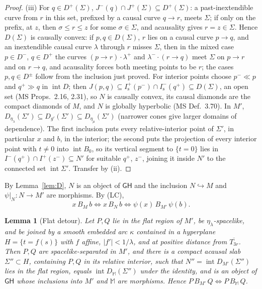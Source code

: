 \documentclass[11pt]{article}
\newtheorem{lemma}[theorem]{Lemma}
\theoremstyle{definition}
\newcommand{\GH}{\mathsf{GH}}
\newcommand{\Mink}{\mathbb M}
\newcommand{\Ifut}{I^{+}}
\newcommand{\Ichr}{I^{-}}
\newcommand{\Jp}{J^{+}}
\newcommand{\Jm}{J^{-}}
\begin{document}
\begin{proof}
(iii) For $q\in D^+(\Sigma)$, $\Jm(q)\cap\Jp(\Sigma)\subseteq D^+(\Sigma)$: a
past-inextendible curve from $r$ in this set, prefixed by a causal curve
$q\to r$, meets $\Sigma$; if only on the prefix, at $z$, then $\sigma\le r\le z$
for some $\sigma\in\Sigma$, and acausality gives $r=z\in\Sigma$. Hence $D(\Sigma)$
is causally convex: if $p,q\in D(\Sigma)$, $r$ lies on a causal curve $p\to q$,
and an inextendible causal curve $\lambda$ through $r$ misses $\Sigma$, then in
the mixed case $p\in D^-$, $q\in D^+$ the curves $(p\to r)\cdot\lambda^+$ and
$\lambda^-\cdot(r\to q)$ meet $\Sigma$ on $p\to r$ and on $r\to q$, and
acausality forces both meeting points to be $r$; the cases $p,q\in D^\pm$
follow from the inclusion just proved. For interior points choose $p^-\ll p$
and $q^+\gg q$ in $\operatorname{int}D$; then
$J(p,q)\subseteq\Ifut_{\mathrm s}(p^-)\cap\Ichr_{\mathrm s}(q^+)\subseteq
D(\Sigma)$, an open set (MS Props.~2.16, 2.31), so $N$ is causally convex, its causal diamonds are the
compact diamonds of $M$, and $N$ is globally hyperbolic (MS Def.~3.70). In
$M'$,
$D_{\eta_\lambda}(\Sigma')\subseteq D_{g'}(\Sigma')\subseteq D_{\eta_\mu}(\Sigma')$
(narrower cones give larger domains of dependence). The first inclusion puts
every relative-interior point of $\Sigma'$, in particular $x$ and $b$, in the
interior; the second puts the projection of every interior point with $t\neq0$
into $\operatorname{int}B_0$, so its vertical segment to $\{t=0\}$ lies in
$\Ichr(q^+)\cap\Ifut(z^-)\subseteq N'$ for suitable $q^+$, $z^-$, joining it
inside $N'$ to the connected set $\operatorname{int}\Sigma'$. Transfer by (ii).
\end{proof}

By Lemma~\ref{lem:D}, $N$ is an object of $\GH$ and the inclusion $N\hookrightarrow
M$ and $\psi|_N:N\to M'$ are morphisms. By (LC),
\begin{equation}\label{eq:transfer}
x\,B_M\,b\iff x\,B_N\,b\iff\psi(x)\,B_{M'}\,\psi(b).
\end{equation}

\begin{lemma}[Flat detour]\label{lem:F}
Let $P,Q$ lie in the flat region of $M'$, be $\eta_\lambda$-spacelike, and be
joined by a smooth embedded arc $\kappa$ contained in a hyperplane
$H=\{t=f(s)\}$ with $f$ affine, $|f'|<1/\lambda$, and at positive distance from
$\overline{T_{3r}}$. Then $P,Q$ are spacelike-separated in $M'$, and there is a
compact acausal slab $\Sigma''\subset H$, containing $P,Q$ in its relative
interior, such that $N''=\operatorname{int}D_{M'}(\Sigma'')$ lies in the flat
region, equals $\operatorname{int}D_\Mink(\Sigma'')$ under the identity, and is
an object of $\GH$ whose inclusions into $M'$ and $\Mink$ are morphisms. Hence
$P\,B_{M'}\,Q\iff P\,B_\Mink\,Q$.
\end{lemma}
\end{document}
